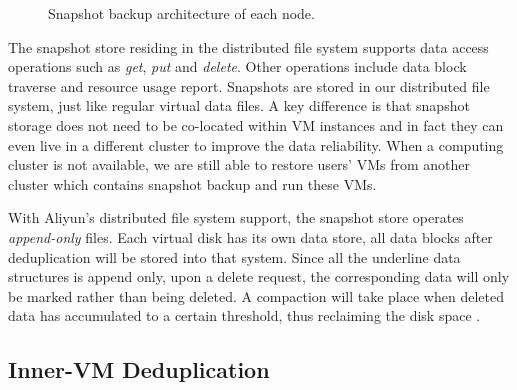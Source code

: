 \begin{figure}[htbp]
  \centering
  \caption{Snapshot backup architecture of each node.}
  \label{fig:arch}
\end{figure}


The snapshot store  residing in the distributed file system
supports data access operations  such as \emph{get}, \emph{put} and \emph{delete}.
Other operations include data block traverse  and resource usage  report.
Snapshots are stored  in our distributed file system, just like regular virtual data files. 
A key  difference is that snapshot storage does not need to be
co-located within VM instances and  in fact they can even live in a different cluster to improve the 
data reliability. When a computing cluster is not available, we are still able to  restore users' VMs from another cluster which
contains snapshot backup and run these VMs. 

With Aliyun's distributed file system support, the snapshot store operates 
\emph{append-only} files. Each virtual disk has its own data store, all data 
blocks after deduplication will be stored into that system.
Since all the underline data structures is append only,
upon a delete request, the corresponding data will only be marked rather than being deleted.
A compaction will take place when deleted data has accumulated to a certain threshold, thus 
reclaiming the disk space .





\subsection{Inner-VM Deduplication}
\label{sect:innerVM}

